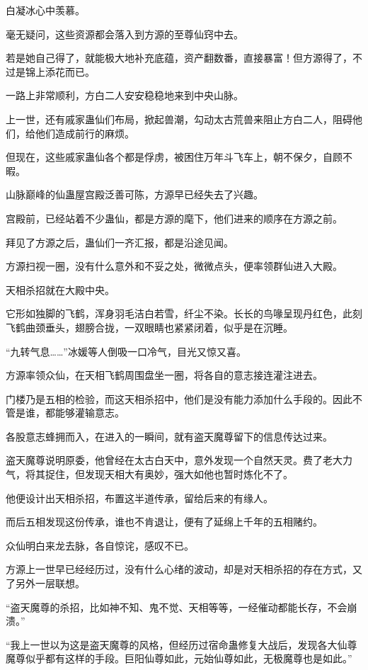 \begin{this_body}
白凝冰心中羡慕。

毫无疑问，这些资源都会落入到方源的至尊仙窍中去。

若是她自己得了，就能极大地补充底蕴，资产翻数番，直接暴富！但方源得了，不过是锦上添花而已。

一路上非常顺利，方白二人安安稳稳地来到中央山脉。

上一世，还有戚家蛊仙们布局，掀起兽潮，勾动太古荒兽来阻止方白二人，阻碍他们，给他们造成前行的麻烦。

但现在，这些戚家蛊仙各个都是俘虏，被困住万年斗飞车上，朝不保夕，自顾不暇。

山脉巅峰的仙蛊屋宫殿泛善可陈，方源早已经失去了兴趣。

宫殿前，已经站着不少蛊仙，都是方源的麾下，他们进来的顺序在方源之前。

拜见了方源之后，蛊仙们一齐汇报，都是沿途见闻。

方源扫视一圈，没有什么意外和不妥之处，微微点头，便率领群仙进入大殿。

天相杀招就在大殿中央。

它形如独脚的飞鹤，浑身羽毛洁白若雪，纤尘不染。长长的鸟喙呈现丹红色，此刻飞鹤曲颈垂头，翅膀合拢，一双眼睛也紧紧闭着，似乎是在沉睡。

“九转气息……”冰媛等人倒吸一口冷气，目光又惊又喜。

方源率领众仙，在天相飞鹤周围盘坐一圈，将各自的意志接连灌注进去。

门楼乃是五相的检验，而这天相杀招中，他们是没有能力添加什么手段的。因此不管是谁，都能够灌输意志。

各股意志蜂拥而入，在进入的一瞬间，就有盗天魔尊留下的信息传达过来。

盗天魔尊说明原委，他曾经在太古白天中，意外发现一个自然天灵。费了老大力气，将其捉住，但发现天相大有奥妙，强大如他也暂时炼化不了。

他便设计出天相杀招，布置这半道传承，留给后来的有缘人。

而后五相发现这份传承，谁也不肯退让，便有了延绵上千年的五相赌约。

众仙明白来龙去脉，各自惊诧，感叹不已。

方源上一世早已经经历过，没有什么心绪的波动，却是对天相杀招的存在方式，又了另外一层联想。

“盗天魔尊的杀招，比如神不知、鬼不觉、天相等等，一经催动都能长存，不会崩溃。”

“我上一世以为这是盗天魔尊的风格，但经历过宿命蛊修复大战后，发现各大仙尊魔尊似乎都有这样的手段。巨阳仙尊如此，元始仙尊如此，无极魔尊也是如此。”


\end{this_body}
